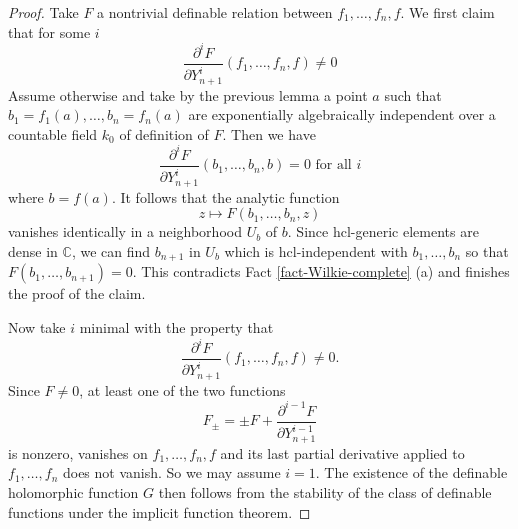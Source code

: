 \documentclass[12pt]{amsart}
\theoremstyle{definition}
\theoremstyle{plain}
\theoremstyle{exampstyle}\newtheorem{thmx}{Theorem}
\theoremstyle{exampstyle}\newtheorem{thmxbis}{Theorem}
\begin{document}
\begin{proof} 
Take $F$ a nontrivial definable relation between $f_1,\ldots,f_n,f$.
We first claim that for some $i$
$$  \frac{\partial^i F} {\partial Y_{n+1}^i}(f_1,\ldots,f_n,f) \neq 0$$
Assume otherwise and take by the previous lemma a point $a$ such that $b_1 = f_1(a),\ldots, b_n = f_n(a)$ are exponentially algebraically independent over a countable field $k_0$ of definition of $F$. Then we have 
$$ \frac{\partial^i F} {\partial Y_{n+1}^i}(b_1,\ldots,b_n,b) = 0 \text{ for all } i$$
where $b = f(a)$. It follows that the analytic function 
$$ z \mapsto F(b_1,\ldots,b_n,z) $$
vanishes identically in a neighborhood $U_b$ of $b$. Since $\mathrm{hcl}$-generic elements are dense in $\mathbb{C}$, we can find $b_{n+1}$ in $U_b$ which is $\mathrm{hcl}$-independent with $b_1,\ldots,b_n$ so that $F(b_1,\ldots,b_{n+1}) = 0$. This contradicts Fact \ref{fact-Wilkie-complete} (a) and finishes the proof of the claim. 


Now take $i$ minimal with the property that 
$$  \frac{\partial^i F} {\partial Y_{n+1}^i}(f_1,\ldots,f_n,f) \neq 0.$$
Since $F \neq 0$, at least one of the two functions 
$$ F_\pm = \pm F + \frac{\partial^{i-1} F} {\partial Y_{n+1}^{i-1}}$$
is nonzero, vanishes on $f_1,\ldots,f_n,f$ and its last partial derivative applied to $f_1,\ldots,f_n$ does not vanish. So we may assume $i = 1$. The existence of the definable holomorphic function $G$ then follows from the stability of the class of definable functions under the implicit function theorem. 
\end{proof}
\end{document}
